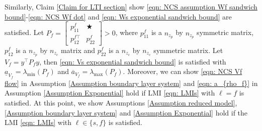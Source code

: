Similarly, Claim \ref{Claim for LTI section} show \eqref{eqn: NCS assumption Wf sandwich bound}-\eqref{eqn: NCS Wf dot} and \eqref{eqn: Ws exponential sandwich bound} are satisfied. 
%
Let $P_f = \left[\begin{smallmatrix}
    p_{11}^f  & \bigstar \\ {p_{12}^{f\top}} & p_{22}^f
\end{smallmatrix} \right] > 0$, where $p_{11}^f$ is a $n_{z_p} $ by $ n_{z_p}$ symmetric matrix, $p_{12}^f$ is a $n_{z_p} $ by $ n_{z_c}$ matrix and $p_{22}^f$ is a $n_{z_c} $ by $ n_{z_c}$ symmetric matrix. Let $V_f = y^\top P_f y$, then \eqref{eqn: Vs exponential sandwich bound} is satisfied with $\underline{a}_{V_f} = \lambda_{\text{min}}(P_f)$ and $\overline{a}_{V_f} = \lambda_{\text{max}}(P_f)$.
%
Moreover, we can show \eqref{eqn: NCS Vf flow} in Assumption \ref{Assumption boundary layer system} and \eqref{eqn: a_{rho_f}} in Assumption \ref{Assumption Exponential} hold if LMI \eqref{eqn: LMIs} with $\ell = f$ is satisfied.
At this point, we show Assumptions \ref{Assumption reduced model}, \ref{Assumption boundary layer system} and \ref{Assumption Exponential} hold if the LMI \eqref{eqn: LMIs} with $\ell \in \{s,f\}$ is satisfied.




